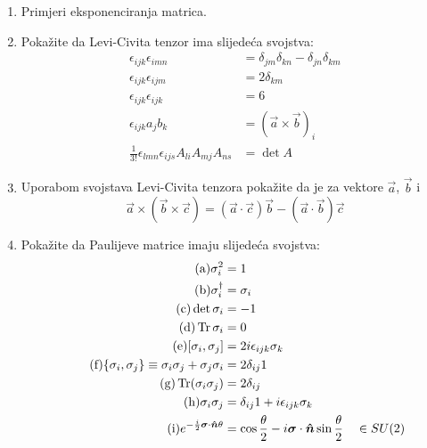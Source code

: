 \begin{enumerate}[label=\arabic{chapter}.\arabic*.]

\item Primjeri eksponenciranja matrica.

\item \label{zad:LeviCivitaProperties} Pokažite da Levi-Civita tenzor ima slijedeća svojstva:
\begin{align*}
\tag{a}\epsilon_{ijk}\epsilon_{imn}&=\delta_{jm}\delta_{kn}-\delta_{jn}\delta_{km}\\
\tag{b}\epsilon_{ijk}\epsilon_{ijm}&=2\delta_{km} \\
\tag{c}\epsilon_{ijk}\epsilon_{ijk}&=6 \\
\tag{d}\epsilon_{ijk}a_j b_k &= (\vec{a}\times\vec{b})_i  \\
\tag{e}\frac{1}{3!}\epsilon_{lmn} \epsilon_{ijs} A_{li} A_{mj} A_{ns} &= \det A
\end{align*}

\item Uporabom svojstava Levi-Civita tenzora pokažite da je
za vektore $\vec{a}$, $\vec{b}$ i 
\begin{displaymath}
    \vec{a}\times(\vec{b}\times\vec{c})=(\vec{a}\cdot\vec{c})\vec{b}
 -(\vec{a}\cdot\vec{b})\vec{c}
\end{displaymath}

\item Pokažite da Paulijeve matrice imaju slijedeća svojstva:
\begin{align*}
\tag{a} \sigma_{i}^2 &= 1 \\
\tag{b} \sigma_{i}^\dagger &= \sigma_i \\
\tag{c} \det \sigma_i &= -1 \\
\tag{d} \Tr \sigma_i &=0 \\
\tag{e} [\sigma_i, \sigma_j] &= 2 i \epsilon_{ijk} \sigma_k \\
\tag{f} \{\sigma_i, \sigma_j\}\equiv \sigma_i\sigma_j + \sigma_j \sigma_i &= 2
\delta_{ij} 1 \\
\tag{g} \Tr (\sigma_i \sigma_j) &= 2\delta_{ij} \\
\tag{h} \sigma_i \sigma_j &= \delta_{ij} 1 + i \epsilon_{ijk}\sigma_k\\
\tag{i} e^{-\frac{i}{2}\vec{\sigma}\cdot\unitn \theta} &=
\cos \frac{\theta}{2}-i\vec{\sigma}\cdot\unitn \sin\frac{\theta}{2} \quad\in SU(2)
\end{align*}


\end{enumerate}
